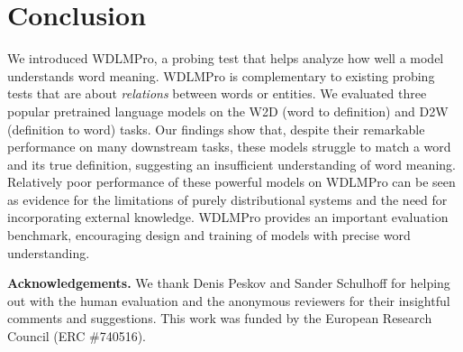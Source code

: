 \documentclass[11pt,a4paper]{article}
\begin{document}
\section{Conclusion}
We introduced
WDLMPro,
a
probing test that helps  analyze  how well a model
understands word meaning. WDLMPro is complementary to existing
probing tests that are about
\emph{relations} between words or entities.
We evaluated three popular pretrained language
models on the W2D (word to definition) and D2W (definition
to word) tasks. Our findings show
that, despite their remarkable performance on many
downstream tasks, these models struggle to match a word and
its true definition, suggesting an insufficient
understanding of word meaning.
Relatively poor performance of these
powerful models on WDLMPro can be seen as evidence
for the limitations of purely distributional systems and
the need for incorporating external knowledge.
WDLMPro provides an important
evaluation benchmark, encouraging design and training of
models with precise word understanding.

\textbf{Acknowledgements.} We thank Denis Peskov and Sander Schulhoff for
helping out with the human evaluation and
the anonymous reviewers for their insightful comments and suggestions.
This work was funded by the European Research Council (ERC \#740516).






   
\end{document}
